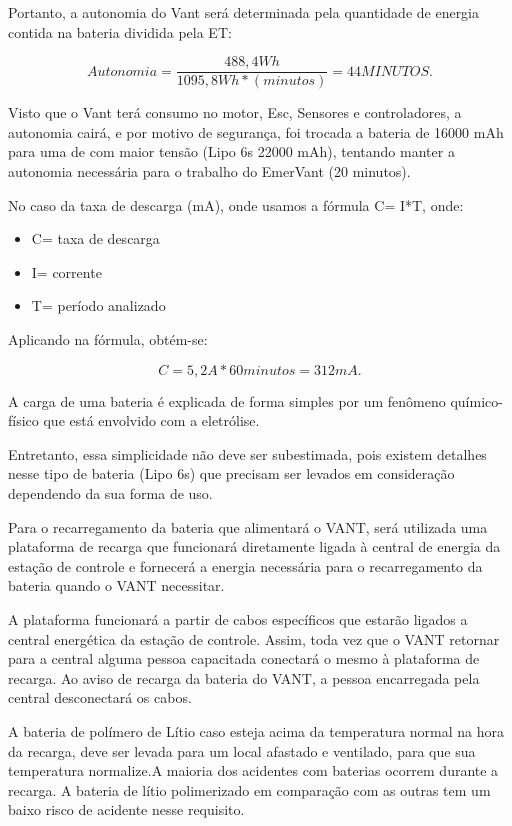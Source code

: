 Portanto, a autonomia do Vant será determinada pela quantidade de energia contida na bateria dividida pela ET:

\begin{equation}
Autonomia = \frac{488,4Wh}{1095,8Wh *(minutos)} = 44 MINUTOS.
\end{equation}

Visto que o Vant terá consumo no motor, Esc, Sensores e controladores, a autonomia cairá, e por motivo de segurança, foi trocada a bateria de 16000 mAh para uma de com maior  tensão (Lipo 6s 22000 mAh), tentando manter a autonomia necessária para o trabalho do EmerVant (20 minutos). 

No caso da taxa de descarga (mA), onde usamos a fórmula C= I*T, onde:

\begin{itemize}
	\item C= taxa de descarga
	\item I= corrente
	\item T= período analizado
\end{itemize}

Aplicando na fórmula, obtém-se: 

\begin{equation}
C= 5,2A* 60 minutos = 312mA.
\end{equation}


A carga de uma bateria é explicada de forma simples por um fenômeno químico-físico que está envolvido com a eletrólise. \cite{gibbs}

Entretanto, essa simplicidade não deve ser subestimada, pois existem detalhes nesse tipo de bateria (Lipo 6s) que precisam ser levados em consideração dependendo da sua forma de uso.

Para o recarregamento da bateria que alimentará o VANT, será utilizada uma plataforma de recarga que funcionará diretamente ligada à  central de energia da estação de controle e fornecerá a energia necessária para o recarregamento da bateria quando o VANT necessitar.

A plataforma funcionará a partir de cabos específicos que estarão ligados a central energética da estação de controle. Assim, toda vez que o VANT retornar para a central alguma pessoa capacitada conectará o mesmo à plataforma de recarga. Ao aviso de recarga da bateria do VANT, a pessoa encarregada pela central desconectará os cabos.

A bateria de polímero de Lítio caso esteja acima da temperatura normal na hora da recarga, deve ser levada para um local afastado e ventilado, para que sua temperatura normalize.A maioria dos acidentes com baterias ocorrem durante a recarga. A bateria de lítio polimerizado em comparação com as outras tem um baixo risco de acidente nesse requisito. \cite{gibbs}

